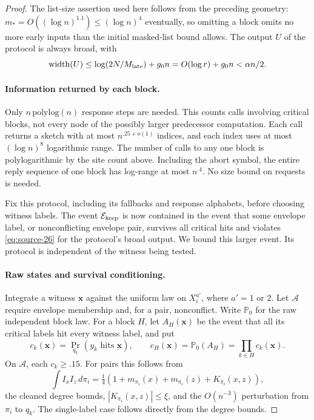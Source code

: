 \begin{proof}
The list-size assertion used here follows from the preceding geometry:
\(m_*=O((\log n)^{1.1})\le(\log n)^4\) eventually, so omitting
a block omits no more early inputs than the initial masked-list bound
allows. The output \(U\) of the protocol is always broad, with
\[
 \operatorname{width}(U)
 \le\log(2N/M_{\rm late})+g_0n
 =O(\log r)+g_0n<\alpha n/2.
\]

\paragraph{Information returned by each block.}
Only \(n\,\mathrm{polylog}(n)\) response steps are needed. This
counts calls involving critical blocks, not every node of the possibly
larger predecessor computation. Each call returns a sketch with at most
\(n^{.25+o(1)}\) indices, and each index uses at most \((\log n)^8\)
logarithmic range. The number of calls to any one block is
polylogarithmic by the site count above. Including the abort symbol,
the entire reply sequence of one block has log-range at most
\(n^{.4}\). No size bound on requests is needed.

Fix this protocol, including its fallbacks and response alphabets,
before choosing witness labels. The event \(\mathcal E_{\rm keep}\)
is now contained in the event that some envelope label, or
nonconflicting envelope pair, survives all critical hits and violates
\eqref{eq:source-26} for the protocol's broad output. We bound this
larger event. Its protocol is independent of the witness being tested.

\paragraph{Raw states and survival conditioning.}
Integrate a witness \(\boldsymbol x\) against the uniform law on
\(X_i^{a'}\), where \(a'=1\) or \(2\). Let \(\mathcal A\)
require envelope membership and, for a pair, nonconflict. Write
\(\mathbb P_0\) for the raw independent block law. For a block \(H\),
let \(A_H(\boldsymbol x)\) be the event that all its critical labels
hit every witness label, and put
\[
 c_k(\boldsymbol x)=\Pr_{q_k}(y_k\text{ hits }\boldsymbol x),\qquad
 c_H(\boldsymbol x)=\mathbb P_0(A_H)=\prod_{k\in H}c_k(\boldsymbol x).
\]
On \(\mathcal A\), each \(c_k\ge .15\). For pairs this follows from
\[
 \int I_x I_z\,d\pi_i
 =\tfrac14(1+m_{\pi_i}(x)+m_{\pi_i}(z)+K_{\pi_i}(x,z)),
\]
the cleaned degree bounds, \(|K_{\pi_i}(x,z)|\le\xi\), and the
\(O(n^{-3})\) perturbation from \(\pi_i\) to \(q_k\). The
single-label case follows directly from the degree bounds.


\end{proof}
